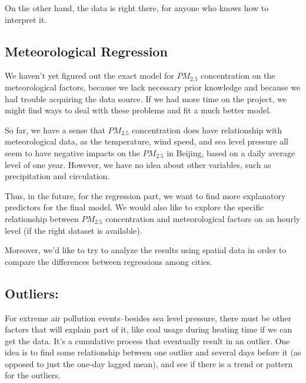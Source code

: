 \documentclass[11pt]{article} %
\begin{document}
On the other hand, the data is right there, for anyone who knows how to interpret it.

\subsection{Meteorological Regression}

We haven't yet figured out the exact model for \(PM_{2.5}\) concentration on the meteorological factors, 
because we lack necessary prior knowledge and because we had trouble acquiring the data source. 
If we had more time on the project, we might find ways to deal with these problems and fit a much better model. 

So far, we have a sense that \(PM_{2.5}\) concentration does have relationship with meteorological data,
as the temperature, wind speed, and sea level pressure all seem to have negative impacts on the \(PM_{2.5}\) in Beijing, based on a daily average level of one year. 
However, we have no idea about other variables, such as precipitation and circulation. 

Thus, in the future, for the regression part, we want to find more explanatory predictors for the final model.
We would also like to explore the specific relationship between \(PM_{2.5}\) concentration and meteorological factors on an hourly level (if the right dataset is available). 

Moreover, we'd like to try to analyze the results using spatial data in order to compare the differences between regressions among cities.

\subsection{Outliers:} 

For extreme air pollution events--besides sea level pressure, there must be other factors that will explain part of it, like coal usage during heating time if we can get the data. It’s a cumulative process that eventually result in an outlier. One idea is to find some relationship between one outlier and several days before it (as opposed to just the one-day lagged mean), and see if there is a trend or pattern for the outliers. 
\end{document}
